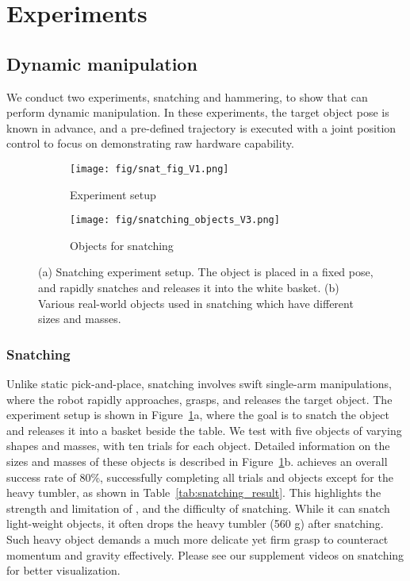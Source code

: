 \section{Experiments}

\subsection{Dynamic manipulation}
We conduct two experiments, snatching and hammering, to show that \robot can perform dynamic manipulation. In these experiments, the target object pose is known in advance, and a pre-defined trajectory is executed with a joint position control to focus on demonstrating raw hardware capability. %


\begin{figure}[hbt]
    \begin{subfigure}{\linewidth}
        \centering
        \texttt{[image: fig/snat\_fig\_V1.png]}
        \caption{Experiment setup}
    \end{subfigure}
    \vfill
    \begin{subfigure}{\linewidth}
        \centering
        \texttt{[image: fig/snatching\_objects\_V3.png]}
        \caption{Objects for snatching}
    \end{subfigure}
    \caption{(a) Snatching experiment setup. The object is placed in a fixed pose, and \robot rapidly snatches and releases it into the white basket. (b) Various real-world objects used in snatching which have different sizes and masses.}
    \label{fig:snatching}
\end{figure}


\subsubsection{\textbf{Snatching}}
Unlike static pick-and-place, snatching involves swift single-arm manipulations, where the robot rapidly approaches, grasps, and releases the target object. The experiment setup is shown in Figure~\ref{fig:snatching}a, where the goal is to snatch the object and releases it into a basket beside the table. We test \robot with five objects of varying shapes and masses, with ten trials for each object. Detailed information on the sizes and masses of these objects is described in Figure~\ref{fig:snatching}b. \robot achieves an overall success rate of 80\%, successfully completing all trials and objects except for the heavy tumbler, as shown in Table~\ref{tab:snatching_result}. This highlights the strength and limitation of \robot, and the difficulty of snatching. While it can snatch light-weight objects, it often drops the heavy tumbler (560 g) after snatching. Such heavy object demands a much more delicate yet firm grasp to counteract momentum and gravity effectively. Please see our supplement videos on snatching for better visualization.

